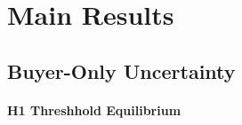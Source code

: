 \section{Main Results}
\label{sec:main_results}



\subsection{Buyer-Only Uncertainty}

\paragraph{H1 Threshhold Equilibrium}




